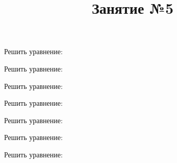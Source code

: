 \newpage
\title{Занятие №5}
\begin{listofex}
	\item Решить уравнение:
	\begin{enumcols}[itemcolumns=2]
		\item {}
		\item {}
		\item {}
		\item {}
	\end{enumcols}
	\item Решить уравнение:
	\begin{enumcols}[itemcolumns=3]
		\item {}
		\item {}
		\item {}
	\end{enumcols}
	\item Решить уравнение:
	\begin{enumcols}[itemcolumns=2]
		\item {}
		\item {}
	\end{enumcols}
	\item Решить уравнение:
	\begin{enumcols}[itemcolumns=3]
		\item {}
		\item {}
		\item {}
	\end{enumcols}
	\item Решить уравнение:
	\begin{enumcols}[itemcolumns=2]
		\item {}
		\item {}
	\end{enumcols}
	\item Решить уравнение:
	\begin{enumcols}[itemcolumns=3]
		\item {}
		\item {}
		\item {}
	\end{enumcols}
	\item Решить уравнение:
	\begin{enumcols}[itemcolumns=2]
		\item {}
		\item {}
	\end{enumcols}
\end{listofex}

